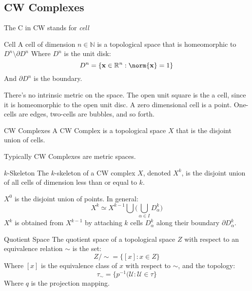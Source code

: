     \subsection{CW Complexes}
        The C in CW stands for \textit{cell}
        \begin{ldefinition}{Cell}
            A cell of dimension $n\in\mathbb{N}$ is
            a topological space that is homeomorphic
            to $D^{n}\setminus\partial{D}^{n}$
            Where $D^{n}$ is the unit disk:
            \begin{equation}
                D^{n}=\{\mathbf{x}\in\mathbb{R}^{n}:
                \norm{\mathbf{x}}=1\}
            \end{equation}
            And $\partial{D}^{n}$ is the boundary.
        \end{ldefinition}
        There's no intrinsic metric on the space.
        The open unit square is the a cell, since
        it is homeomorphic to the open unit disc.
        A zero dimensional cell is a point.
        One-cells are edges, two-cells are
        bubbles, and so forth.
        \begin{ldefinition}{CW Complexes}
            A CW Complex is a topological space
            $X$ that is the disjoint union of
            cells.
        \end{ldefinition}
        Typically CW Complexes are metric spaces.
        \begin{ldefinition}{$k$-Skeleton}
            The $k$-skeleton of a CW complex $X$,
            denoted $X^{k}$,
            is the disjoint union of all cells of
            dimension less than or equal to $k$.
        \end{ldefinition}
        $X^{0}$ is the disjoint union of points.
        In general:
        \begin{equation}
            X^{k}\simeq{X}^{k-1}\bigcup\Big(
                \bigcup_{\alpha\in{I}}D_{\alpha}^{k}
            \Big)
        \end{equation}
        $X^{k}$ is obtained from $X^{k-1}$ by
        attaching $k$ cells $D_{\alpha}^{k}$ along
        their boundary $\partial{D}_{\alpha}^{k}$.
        \begin{ldefinition}{Quotient Space}
            The quotient space of a topological
            space $Z$ with respect to an equivalence
            relation $\sim$ is the set:
            \begin{equation}
                Z/\sim=\{[x]:x\in{Z}\}
            \end{equation}
            Where $[x]$ is the equivalence class of
            $x$ with respect to $\sim$, and the
            topology:
            \begin{equation}
                \tau_{\sim}=
                \{p^{-1}(\mathcal{U}:
                \mathcal{U}\in\tau\}
            \end{equation}
            Where $q$ is the projection mapping.
        \end{ldefinition}

